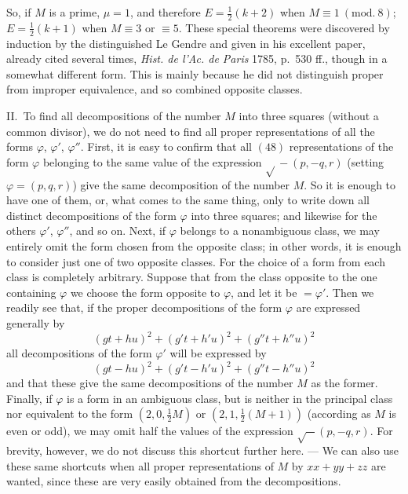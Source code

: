 So, if $M$ is a prime, $\mu=1$, and therefore $E=\tfrac{1}{2}(k+2)$ when
$M\equiv1\ (\mathrm{mod.}\ 8)$; $E=\tfrac{1}{2}(k+1)$ when $M\equiv3$ or $\equiv5$. These special theorems
were discovered by induction by the distinguished Le Gendre and given
in his excellent paper, already cited several times, \textit{Hist.
de l'Ac. de Paris} 1785, p.\ 530 ff., though in a somewhat different
form. This is mainly because he did not distinguish proper from
improper equivalence, and so combined opposite classes.

II.\ To find all decompositions of the number $M$ into three
squares (without a common divisor), we do not need to find all proper
representations of all the forms $\varphi$, $\varphi'$, $\varphi''$. First,
it is easy to confirm that all $(48)$ representations of the form
$\varphi$ belonging to the same value of the expression $\surd{}-(p,-q,r)$ (setting
$\varphi=(p,q,r)$) give the same decomposition of the number $M$. So it
is enough to have one of them, or, what comes to the same thing, only
to write down all distinct decompositions of the form $\varphi$
into three squares; and likewise for the others $\varphi'$, $\varphi''$,
and so on. Next, if $\varphi$ belongs to a nonambiguous class, we may
entirely omit the form chosen from the opposite class; in other words,
it is enough to consider just one of two opposite classes. For the
choice of a form from each class is completely arbitrary. Suppose
that from the class opposite to the one containing $\varphi$ we choose
the form opposite to $\varphi$, and let it be $=\varphi'$. Then we readily
see that, if
the proper decompositions of the form \(\varphi\) are expressed generally by
\[
(gt+hu)^2+(g't+h'u)^2+(g''t+h''u)^2
\]
all decompositions of the form \(\varphi'\) will be expressed by
\[
(gt-hu)^2+(g't-h'u)^2+(g''t-h''u)^2
\]
and that these give the same decompositions of the number \(M\)
as the former. Finally, if \(\varphi\) is a form in an ambiguous class,
but is neither in the principal class nor equivalent to the form
\((2,0,\frac12 M)\) or \((2,1,\frac12(M+1))\) (according as \(M\) is even or odd),
we may omit half the values of the expression \(\surd-(p,-q,r)\). For brevity,
however, we do not discuss this shortcut further here. --- We can
also use these same shortcuts when all proper representations of
\(M\) by \(xx+yy+zz\) are wanted, since these are very easily obtained
from the decompositions.

